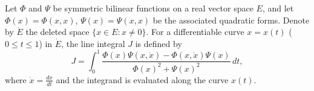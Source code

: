 Let $\Phi$ and $\Psi$ be symmetric bilinear functions on a real vector space $E$, and let $\Phi(x) = \Phi(x,x)$, $\Psi(x) = \Psi(x,x)$ be the associated quadratic forms. Denote by $\dot{E}$ the deleted space $\{x \in E : x \neq 0\}$. For a differentiable curve $x = x(t)$ ($0 \leq t \leq 1$) in $\dot{E}$, the line integral $J$ is defined by
$$J = \int_0^1 \frac{\Phi(x)\Psi(x, \dot{x}) - \Phi(x, \dot{x})\Psi(x)}{\Phi(x)^2 + \Psi(x)^2} \, dt,$$
where $\dot{x} = \frac{dx}{dt}$ and the integrand is evaluated along the curve $x(t)$.
